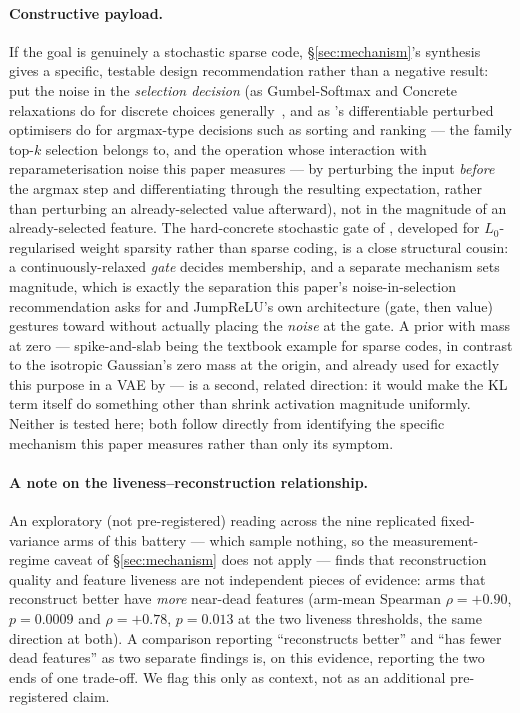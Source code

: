 \documentclass[11pt]{article}
\begin{document}
\paragraph{Constructive payload.} If the goal is genuinely a stochastic
sparse code, \S\ref{sec:mechanism}'s synthesis gives a specific, testable
design recommendation rather than a negative result: put the noise in the
\emph{selection decision} (as Gumbel-Softmax and Concrete relaxations do for
discrete choices generally~\citep{jang2016categorical,maddison2016concrete},
and as \citet{berthet2020learning}'s differentiable perturbed optimisers do
for argmax-type decisions such as sorting and ranking --- the family top-$k$
selection belongs to, and the operation whose interaction with
reparameterisation noise this paper measures --- by perturbing the input
\emph{before} the argmax step and
differentiating through the resulting expectation, rather than perturbing
an already-selected value afterward), not in the magnitude of an
already-selected feature. The hard-concrete stochastic gate of
\citet{louizos2018learning}, developed for $L_0$-regularised weight
sparsity rather than sparse coding, is a close structural cousin: a
continuously-relaxed \emph{gate} decides membership, and a separate
mechanism sets magnitude, which is exactly the separation this paper's
noise-in-selection recommendation asks for and JumpReLU's own architecture
(gate, then value) gestures toward without actually placing the
\emph{noise} at the gate. A prior with mass at zero --- spike-and-slab
being the textbook example for sparse codes, in contrast to the isotropic
Gaussian's zero mass at the origin, and already used for exactly this
purpose in a VAE by \citet{tonolini2020variational} --- is a second,
related direction: it would make the KL term itself do something other
than shrink activation magnitude uniformly. Neither is tested here; both
follow directly from identifying the specific mechanism this paper
measures rather than only its symptom.

\paragraph{A note on the liveness--reconstruction relationship.} An
exploratory (not pre-registered) reading across the nine replicated
fixed-variance arms of this battery --- which sample nothing, so the
measurement-regime caveat of \S\ref{sec:mechanism} does not apply --- finds
that reconstruction quality and feature liveness are not independent pieces of
evidence: arms that reconstruct better have \emph{more} near-dead features
(arm-mean Spearman $\rho=+0.90$, $p=0.0009$ and $\rho=+0.78$, $p=0.013$ at the
two liveness thresholds, the same direction at both). A comparison reporting
``reconstructs better'' and ``has fewer dead features'' as two separate
findings is, on this evidence, reporting the two ends of one trade-off. We flag
this only as context, not as an additional pre-registered claim.
\end{document}
